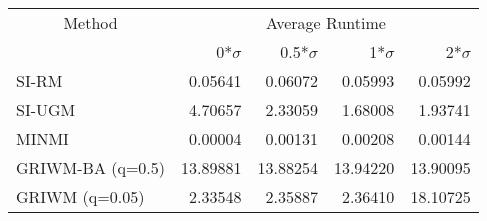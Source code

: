
\begin{tabular}{lrrrr}
\toprule
\multicolumn{1}{c}{Method} & \multicolumn{4}{c}{Average Runtime} \\
 & 0*$\sigma$ & 0.5*$\sigma$ & 1*$\sigma$ & 2*$\sigma$\\
\midrule
SI-RM & 0.05641 & 0.06072 & 0.05993 & 0.05992\\
SI-UGM & 4.70657 & 2.33059 & 1.68008 & 1.93741\\
MINMI & 0.00004 & 0.00131 & 0.00208 & 0.00144\\
GRIWM-BA (q=0.5) & 13.89881 & 13.88254 & 13.94220 & 13.90095\\
GRIWM (q=0.05) & 2.33548 & 2.35887 & 2.36410 & 18.10725\\
\bottomrule
\end{tabular}
